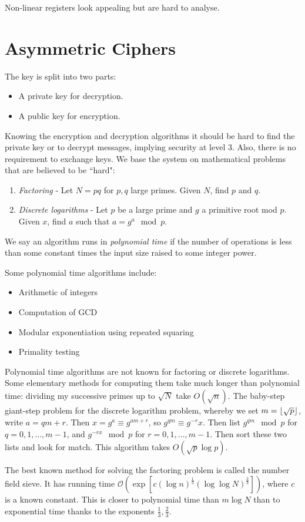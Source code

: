 \documentclass[10pt,a4paper]{article}
\begin{document}
Non-linear registers look appealing but are hard to analyse.

\section{Asymmetric Ciphers}
The key is split into two parts:
\begin{itemize}
\item A private key for decryption.
\item A public key for encryption.
\end{itemize}
Knowing the encryption and decryption algorithms it should be hard to find the private key or to decrypt messages, implying security at level 3. Also, there is no requirement to exchange keys. We base the system on mathematical problems that are believed to be ``hard":
\begin{enumerate}
\item \emph{Factoring} - Let $N = pq$ for $p,q$ large primes. Given $N$, find $p$ and $q$.
\item \emph{Discrete logarithms} - Let $p$ be a large prime and $g$ a primitive root mod $p$. Given $x$, find $a$ such that $a = g^a \mod p$.
\end{enumerate}
We say an algorithm runs in \emph{polynomial time} if the number of operations is less than some constant times the input size raised to some integer power. 

Some polynomial time algorithms include:
\begin{itemize}
\item Arithmetic of integers
\item Computation of GCD
\item Modular exponentiation using repeated squaring
\item Primality testing
\end{itemize}
Polynomial time algorithms are not known for factoring or discrete logarithms. Some elementary methods for computing them take much longer than polynomial time: dividing my successive primes up to $\sqrt{N}$ take $O(\sqrt{n})$. The baby-step giant-step problem for the discrete logarithm problem, whereby we set $m = \lfloor \sqrt{p} \rfloor$, write $a = qm+r$. Then $x = g^a \equiv g^{am+r}$, so $g^{qm}\equiv g^{-r}x$. Then list $g^{qm}\mod p$ for $q = 0, 1, \ldots, m-1$, and $g^{-rx} \mod p$ for $r = 0,1, \ldots, m-1$. Then sort these two lists and look for match. This algorithm takes $O(\sqrt{p}\log p)$.

The best known method for solving the factoring problem is called the number field sieve. It has running time $\mathcal{O}(\exp[c(\log n)^{\frac13}(\log\log N)^{\frac23}])$, where $c$ is a known constant. This is closer to polynomial time than $m \log N$ than to exponential time thanks to the exponents $\frac13,\frac23$.
\end{document}
